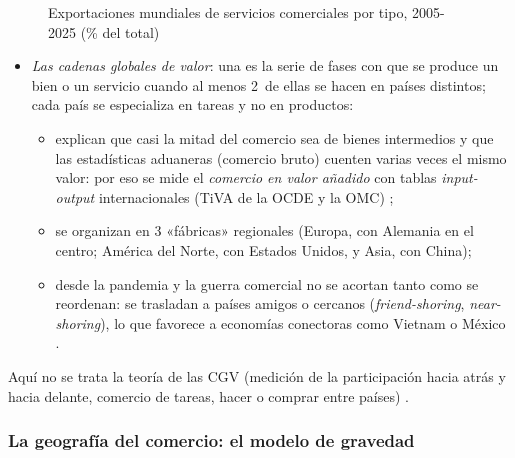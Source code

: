 \documentclass[11pt]{article}
\begin{document}
\begin{figure}[H]
\centering
\caption{Exportaciones mundiales de servicios comerciales por tipo, 2005-2025 (\% del total)}\label{fig:servicios-composicion}
\end{figure}

\begin{itemize}
\item \emph{Las cadenas globales de valor}: una  es la serie de fases con que se produce un bien o un servicio cuando al menos 2~de ellas se hacen en países distintos; cada país se especializa en tareas y no en productos\nocite{BM2020WDR}:
  \begin{itemize}
  \item explican que casi la mitad del comercio sea de bienes intermedios y que las estadísticas aduaneras (comercio bruto) cuenten varias veces el mismo valor: por eso se mide el \emph{comercio en valor añadido} con tablas \emph{input-output} internacionales (TiVA de la OCDE y la OMC) ;
  \item se organizan en 3 «fábricas» regionales (Europa, con Alemania en el centro; América del Norte, con Estados Unidos, y Asia, con China);
  \item desde la pandemia y la guerra comercial no se acortan tanto como se reordenan: se trasladan a países amigos o cercanos (\emph{friend-shoring}, \emph{near-shoring}), lo que favorece a economías conectoras como Vietnam o México .
  \end{itemize}
\end{itemize}

\begin{anotaciones}
Aquí no se trata la teoría de las CGV (medición de la participación hacia atrás y hacia delante, comercio de tareas, hacer o comprar entre países) .
\end{anotaciones}

\subsubsection{La geografía del comercio: el modelo de gravedad}\label{sec:gravedad}
\end{document}
